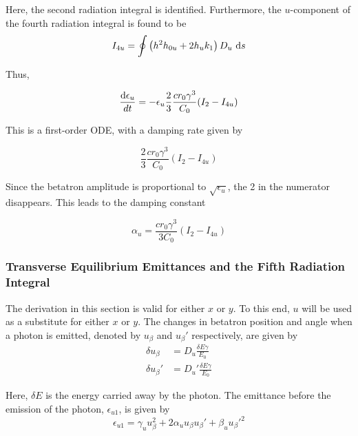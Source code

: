 Here, the second radiation integral is identified. Furthermore, the $u$-component of the fourth radiation integral is found to be
\begin{equation}
    I_{4u} = \oint \left( h^2 h_{0u} + 2 h_u k_1 \right) D_u\ \text{d} s
\end{equation}

Thus,

\begin{equation}
    \frac{\text{d} \epsilon_u}{dt} = - \epsilon_u \frac{2}{3} \frac{c r_0 \gamma^3}{C_0} (I_2 - I_{4u})
\end{equation}

This is a first-order ODE, with a damping rate given by

\begin{equation}
    \frac{2}{3} \frac{c r_0 \gamma^3}{C_0} (I_2 - I_{4u})
\end{equation}

Since the betatron amplitude is proportional to $\sqrt{\epsilon_u}$, the 2 in the numerator disappears. This leads to the damping constant

\begin{equation}
    \alpha_u = \frac{c r_0 \gamma^3}{3C_0} (I_2 - I_{4u})
\end{equation}

\subsubsection{Transverse Equilibrium Emittances and the Fifth Radiation Integral}
\label{sec:transverseeqemiti5}

The derivation in this section is valid for either $x$ or $y$. To this end, $u$ will be used as a substitute for either $x$ or $y$. The changes in betatron position and angle when a photon is emitted, denoted by $u_\beta$ and $u_\beta'$ respectively, are given by
\begin{align}
    \delta u_\beta  &= D_u  \frac{\delta E\gamma}{E_0}
    \label{eq:deltaubeta}\\
    \delta u_\beta' &= D_u' \frac{\delta E\gamma}{E_0}
    \label{eq:deltaubetaprime}
\end{align}

Here, $\delta E$ is the energy carried away by the photon. The emittance before the emission of the photon, $\epsilon_{u1}$, is given by
\begin{equation}
    \epsilon_{u1} = \gamma_u u_\beta^2 + 2 \alpha_u u_\beta u_\beta' + \beta_u u_\beta'^2
\end{equation}

